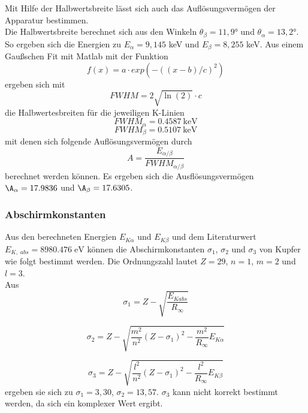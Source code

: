 Mit Hilfe der Halbwertsbreite lässt sich auch das Auflösungsvermögen der Apparatur bestimmen. \\
Die Halbwertsbreite berechnet sich aus den Winkeln $\theta_\beta = 11,9°$ und $\theta_\alpha = 13,2°$.\\
So ergeben sich die Energien zu $E_\alpha = 9,145$ keV und $E_\beta = 8,255$ keV. Aus einem Gaußschen Fit mit Matlab mit der Funktion
\begin{equation*}
  f(x)=a\cdot exp(-((x-b)/c)^2)
\end{equation*} 
ergeben sich mit
\begin{equation*}
  FWHM=2\sqrt{\ln(2)}\cdot c
\end{equation*} 
die Halbwertesbreiten für die jeweiligen K-Linien
\begin{equation*}
  FWHM_{\alpha}=0.4587\ \si{\keV}
\end{equation*}
\begin{equation*}
  FWHM_{\beta}=0.5107\ \si{\keV}
\end{equation*} 
mit denen sich folgende Auflösungsvermögen durch
\begin{equation*}
  A=\frac{E_{\alpha/\beta}}{FWHM_{\alpha/\beta}}
\end{equation*}
berechnet werden können.
Es ergeben sich die Ausflösungsvermögen $\A_\alpha=17.9836$ und $\A_\beta=17.6305$.\\


\subsubsection*{Abschirmkonstanten}

Aus den berechneten Energien $E_{K \alpha}$ und $E_{K \beta}$ und dem Literaturwert $E_{K,\;abs} = 8980.476 \; \mathrm{eV}$ können die 
Abschirmkonstanten $\sigma_1$, $\sigma_2$ und $\sigma_3$ von Kupfer wie folgt bestimmt werden. Die Ordnungszahl lautet $Z = 29$, $n=1$, $m=2$ und $l=3$. \\
Aus 
\begin{equation*}
  \sigma_1=Z-\sqrt{\frac{E_{Kabs}}{R_\infty}}
  \label{eq:sigma}
\end{equation*}
  
\begin{equation*}
  \sigma_2=Z-\sqrt{ \frac{m^2}{n^2}(Z-\sigma_1)^2 - \frac{m^2}{R_\infty} E_{K\alpha}}
\end{equation*}
  
\begin{equation*}
      \sigma_3=Z-\sqrt{ \frac{l^2}{n^2}(Z-\sigma_1)^2 - \frac{l^2}{R_\infty} E_{K\beta}}
\end{equation*}
ergeben sie sich zu $\sigma_1 = 3,30$, $\sigma_2 = 13,57$. 
$\sigma_3$ kann nicht korrekt bestimmt werden, da sich ein komplexer Wert ergibt.




